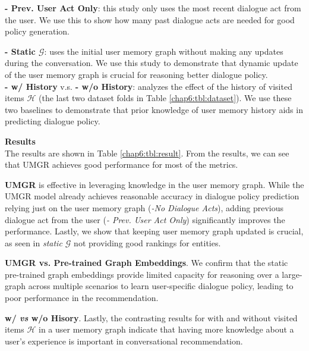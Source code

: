 \noindent \textbf{- Prev. User Act Only}: this study only uses the most recent dialogue act from the user. We use this to show how many past dialogue acts are needed for good policy generation.

\noindent \textbf{- Static $\mathcal{G}$}: uses the initial user memory graph without making any updates during the conversation. We use this study to demonstrate that dynamic update of the user memory graph is crucial for reasoning better dialogue policy.\\

\noindent \textbf{- w/ History} v.s. \textbf{- w/o History}: analyzes the effect of the history of visited items $\mathcal{H}$ (the last two dataset folds in Table \ref{chap6:tbl:dataset}). We use these two baselines to demonstrate that prior knowledge of user memory history aids in predicting dialogue policy.


\textbf{Results}\\
The results are shown in Table \ref{chap6:tbl:result}. From the results, we can see that UMGR achieves good performance for most of the metrics.

\noindent \textbf{UMGR} is effective in leveraging knowledge in the user memory graph.
While the UMGR model already achieves reasonable accuracy in dialogue policy prediction relying just on the user memory graph (\textit{-No Dialogue Acts}),
adding previous dialogue act from the user (\textit{- Prev. User Act Only}) significantly improves the performance.
Lastly, we show that keeping user memory graph updated is crucial, as seen in \textit{static $\mathcal{G}$} not providing good rankings for entities.  

\noindent \textbf{UMGR vs. Pre-trained Graph Embeddings}. We confirm that the static pre-trained graph embeddings provide limited capacity for reasoning over a large-graph across multiple scenarios to learn user-specific dialogue policy, leading to poor performance in the recommendation.

\noindent \textbf{w/ \textit{vs} w/o Hisory}. Lastly, the contrasting results for with and without visited items $\mathcal{H}$ in a user memory graph indicate that having more knowledge about a user's experience is important in conversational recommendation.


